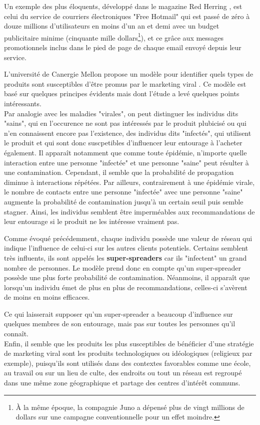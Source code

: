Un exemple des plus éloquents, développé dans le magazine Red Herring \cite{VM}, est celui du service de courriers électroniques "Free Hotmail" qui est passé de zéro à douze millions d'utilisateurs en moins d'un an et demi avec un budget publicitaire minime (cinquante mille dollars\footnote{À la même époque, la compagnie Juno a dépensé plus de vingt millions de dollars sur une campagne conventionnelle pour un effet moindre.}), et ce grâce aux messages promotionnels inclus dans le pied de page de chaque email envoyé depuis leur service.

L'université de Canergie Mellon propose un modèle pour identifier quels types de produits sont susceptibles d'être promus par le marketing viral \cite{viralTWeb}. Ce modèle est basé sur quelques principes évidents mais dont l'étude a levé quelques points intéressants.\\

Par analogie avec les maladies "virales", on peut distinguer les individus dits "sains", qui en l'occurence ne sont pas intéressés par le produit plubicisé ou qui n'en connaissent encore pas l'existence, des individus dits "infectés", qui utilisent le produit et qui sont donc suscpetibles d'influencer leur entourage à l'acheter également.
Il apparaît notamment que comme toute épidémie, n'importe quelle interaction entre une personne "infectée" et une personne "saine" peut résulter à une contamination. Cependant, il semble que la probabilité de propagation diminue à interactions répétées.
Par ailleurs, contrairement à une épidémie virale, le nombre de contacts entre une personne "infectée" avec une personne "saine" augmente la probabilité de contamination jusqu'à un certain seuil puis semble stagner. Ainsi, les individus semblent être imperméables aux recommandations de leur entourage si le produit ne les intéresse vraiment pas.

Comme évoqué précédemment, chaque individu possède une valeur de réseau qui indique l'influence de celui-ci sur les autres clients potentiels. Certains semblent très influents, ils sont appelés les \textbf{super-spreaders} \cite{viralTWeb} car ils "infectent" un grand nombre de personnes. Le modèle prend donc en compte qu'un super-spreader possède une plus forte probabilité de contamination. Néanmoins, il apparaît que lorsqu'un individu émet de plus en plus de recommandations, celles-ci s'avèrent de moins en moins efficaces.

Ce qui laisserait supposer qu'un super-spreader a beaucoup d'influence sur quelques membres de son entourage, mais pas sur toutes les personnes qu'il connaît.\\
Enfin, il semble que les produits les plus susceptibles de bénéficier d'une stratégie de marketing viral sont les produits technologiques ou idéologiques (religieux par exemple), puisqu'ils sont utilisés dans des contextes favorables comme une école, au travail ou sur un lieu de culte, des endroits ou tout un réseau est regroupé dans une même zone géographique et partage des centres d'intérêt communs.

